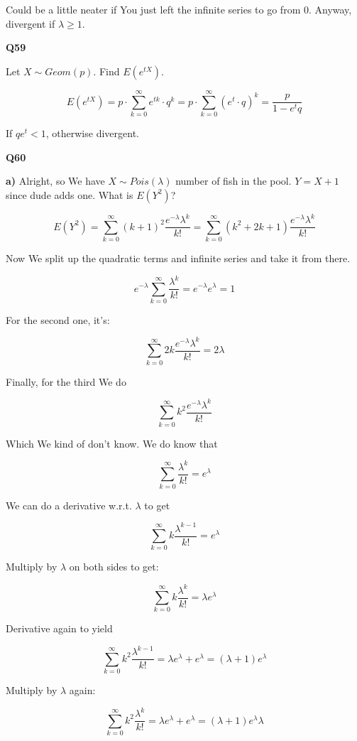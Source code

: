 \documentclass{article}
\begin{document}
		Could be a little neater if You just left the infinite series to go from 0. Anyway, divergent if $\lambda \ge 1$.
		
		\hfill
		
		\textbf{Q59}
		
		Let $X\sim Geom(p)$. Find $E(e^{tX})$.
		
		\[ E(e^{tX}) = p\cdot\sum^\infty_{k=0} e^{tk}\cdot q^k = p\cdot\sum^\infty_{k=0} (e^{t}\cdot q)^k = \frac{p}{1-e^tq}\]
		
		If $qe^t < 1$, otherwise divergent.
		
		\hfill
		
		\textbf{Q60}
		
		\textbf{a)} Alright, so We have $X\sim Pois(\lambda)$ number of fish in the pool. $Y = X+1$ since dude adds one. What is $E(Y^2)$?
		
		\[ E(Y^2) = \sum^\infty_{k=0} (k+1)^2 \frac{e^{-\lambda}\lambda^k}{k!} = \sum^\infty_{k=0} (k^2+2k+1)\frac{e^{-\lambda}\lambda^k}{k!} \]
		
		Now We split up the quadratic terms and infinite series and take it from there. 
		
		\[ e^{-\lambda}\sum^\infty_{k=0} \frac{\lambda^k}{k!} = e^{-\lambda}e^\lambda = 1 \]
				
		For the second one, it's:
		
		\[ \sum^\infty_{k=0} 2k\frac{e^{-\lambda}\lambda^k}{k!} = 2\lambda\]
		
		Finally, for the third We do 
		
		\[ \sum^\infty_{k=0} k^2\frac{e^{-\lambda}\lambda^k}{k!} \]
		
		Which We kind of don't know. We do know that 
		
		\[ \sum^\infty_{k=0} \frac{\lambda^k}{k!} = e^\lambda\]
		
		We can do a derivative w.r.t. $\lambda$ to get
		
		\[ \sum^\infty_{k=0} k\frac{\lambda^{k-1}}{k!} = e^\lambda \]
		
		Multiply by $\lambda$ on both sides to get:
		
		\[ \sum^\infty_{k=0} k\frac{\lambda^{k}}{k!} = \lambda e^\lambda \]
		
		Derivative again to yield
		
		\[ \sum^\infty_{k=0} k^2\frac{\lambda^{k-1}}{k!} = \lambda e^{\lambda} + e^\lambda = (\lambda+1)e^\lambda \]
		
		Multiply by $\lambda$ again:
		
		\[ \sum^\infty_{k=0} k^2\frac{\lambda^{k}}{k!} = \lambda e^{\lambda} + e^\lambda = (\lambda+1)e^\lambda\lambda \]
				
\end{document}
